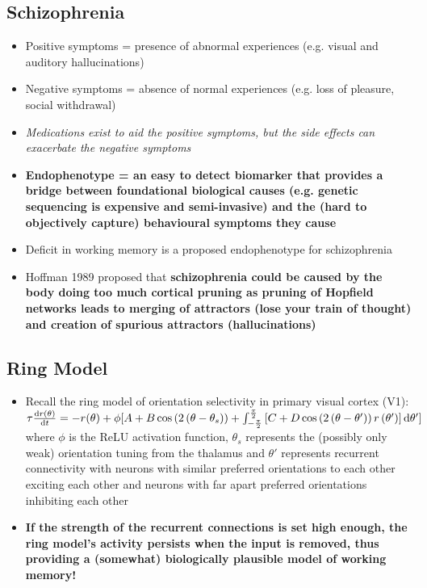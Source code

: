 \documentclass[20pt,a4paper,landscape]{extarticle}
\begin{document}
\begin{flushleft}
\subsection{Schizophrenia}
\begin{itemize}
\item Positive symptoms = presence of abnormal experiences (e.g. visual and auditory hallucinations)
\item Negative symptoms = absence of normal experiences (e.g. loss of pleasure, social withdrawal)
\item \textit{Medications exist to aid the positive symptoms, but the side effects can exacerbate the negative symptoms}
\item \textbf{Endophenotype = an easy to detect biomarker that provides a bridge between foundational biological causes (e.g. genetic sequencing is expensive and semi-invasive) and the (hard to objectively capture) behavioural symptoms they cause}
\item Deficit in working memory is a proposed endophenotype for schizophrenia
\item Hoffman 1989 proposed that \textbf{schizophrenia could be caused by the body doing too much cortical pruning as pruning of Hopfield networks leads to merging of attractors (lose your train of thought) and creation of spurious attractors (hallucinations)}
\end{itemize}
\clearpage
\subsection{Ring Model}
\begin{itemize}
\item Recall the ring model of orientation selectivity in primary visual cortex (V1): $\tau\odv{r\left(\theta\right)}{t}=-r(\theta) +\allowbreak \phi[A +B\cos\left(2\left(\theta - \theta_s\right)\right) +\allowbreak \int_{-\frac{\pi}{2}}^{\frac{\pi}{2}}\left[C + D\cos\left(2\left(\theta - \theta'\right)\right)r\left(\theta'\right)\right]\odif{\theta'}]$ where $\phi$ is the ReLU activation function, $\theta_s$ represents the (possibly only weak) orientation tuning from the thalamus and $\theta'$ represents recurrent connectivity with neurons with similar preferred orientations to each other exciting each other and neurons with far apart preferred orientations inhibiting each other
\item \textbf{If the strength of the recurrent connections is set high enough, the ring model's activity persists when the input is removed, thus providing a (somewhat) biologically plausible model of working memory!}
\end{itemize}

\end{flushleft}
\end{document}
